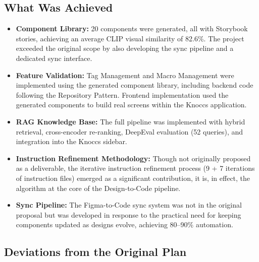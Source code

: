 \subsection{What Was Achieved}

\begin{itemize}
    \item \textbf{Component Library:} 20 components were generated, all with Storybook stories, achieving an average CLIP visual similarity of 82.6\%. The project exceeded the original scope by also developing the sync pipeline and a dedicated sync interface.
    \item \textbf{Feature Validation:} Tag Management and Macro Management were implemented using the generated component library, including backend code following the Repository Pattern. Frontend implementation used the generated components to build real screens within the Knoccs application.
    \item \textbf{RAG Knowledge Base:} The full pipeline was implemented with hybrid retrieval, cross-encoder re-ranking, DeepEval evaluation (52 queries), and integration into the Knoccs sidebar.
    \item \textbf{Instruction Refinement Methodology:} Though not originally proposed as a deliverable, the iterative instruction refinement process (9 + 7 iterations of instruction files) emerged as a significant contribution, it is, in effect, the algorithm at the core of the Design-to-Code pipeline.
    \item \textbf{Sync Pipeline:} The Figma-to-Code sync system was not in the original proposal but was developed in response to the practical need for keeping components updated as designs evolve, achieving 80--90\% automation.
\end{itemize}

\subsection{Deviations from the Original Plan}

